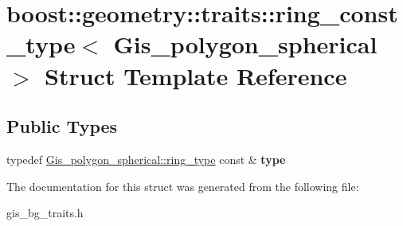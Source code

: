 \hypertarget{structboost_1_1geometry_1_1traits_1_1ring__const__type_3_01Gis__polygon__spherical_01_4}{}\section{boost\+:\+:geometry\+:\+:traits\+:\+:ring\+\_\+const\+\_\+type$<$ Gis\+\_\+polygon\+\_\+spherical $>$ Struct Template Reference}
\label{structboost_1_1geometry_1_1traits_1_1ring__const__type_3_01Gis__polygon__spherical_01_4}
\subsection*{Public Types}
\begin{DoxyCompactItemize}
\item 
\mbox{\label{structboost_1_1geometry_1_1traits_1_1ring__const__type_3_01Gis__polygon__spherical_01_4_afc1214354b57ae18933841f57369a78a}} 
typedef \mbox{\hyperlink{classGis__polygon__ring__spherical}{Gis\+\_\+polygon\+\_\+spherical\+::ring\+\_\+type}} const  \& {\bfseries type}
\end{DoxyCompactItemize}


The documentation for this struct was generated from the following file\+:\begin{DoxyCompactItemize}
\item 
gis\+\_\+bg\+\_\+traits.\+h\end{DoxyCompactItemize}
